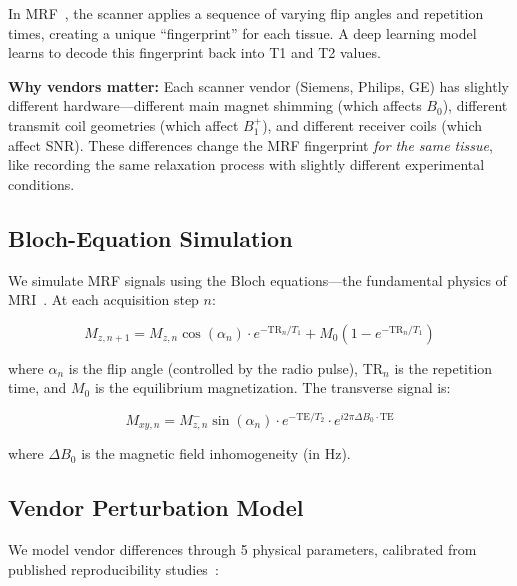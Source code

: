 \documentclass[11pt,a4paper]{article}
\begin{document}
In MRF~\cite{ma2013magnetic}, the scanner applies a sequence of
varying flip angles and repetition times, creating a unique ``fingerprint''
for each tissue. A deep learning model learns to decode this fingerprint back into
T1 and T2 values.

\begin{mdframed}[style=insightbox]
\textbf{Why vendors matter:} Each scanner vendor (Siemens, Philips, GE)
has slightly different hardware---different main magnet shimming (which
affects $B_0$), different transmit coil geometries (which affect
$B_1^+$), and different receiver coils (which affect SNR). These
differences change the MRF fingerprint \emph{for the same tissue}, like
recording the same relaxation process with slightly different
experimental conditions.
\end{mdframed}

\subsection{Bloch-Equation Simulation}

We simulate MRF signals using the Bloch equations---the fundamental
physics of MRI~\cite{haacke1999magnetic}. At each acquisition step $n$:

\begin{equation}
  M_{z,n+1} = M_{z,n} \cos(\alpha_n) \cdot e^{-\text{TR}_n/T_1}
  + M_0 (1 - e^{-\text{TR}_n/T_1})
\end{equation}

where $\alpha_n$ is the flip angle (controlled by the radio pulse),
TR$_n$ is the repetition time, and $M_0$ is the equilibrium
magnetization. The transverse signal is:

\begin{equation}
  M_{xy,n} = M_{z,n}^- \sin(\alpha_n) \cdot e^{-\text{TE}/T_2}
  \cdot e^{i 2\pi \Delta B_0 \cdot \text{TE}}
\end{equation}

where $\Delta B_0$ is the magnetic field inhomogeneity (in Hz).

\subsection{Vendor Perturbation Model}

We model vendor differences through 5 physical parameters, calibrated
from published reproducibility studies~\cite{captur2020t1}:
\end{document}

